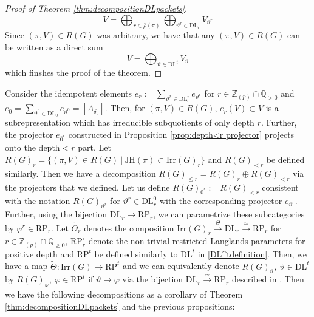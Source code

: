 \documentclass[11 pt]{article}
\numberwithin{equation}{subsection}
\theoremstyle{definition}
\theoremstyle{remark}
\theoremstyle{conjecture}
\newcommand{\Irr}{\mathrm{Irr}}
\newcommand{\DL}{\mathrm{DL}}
\newcommand{\RP}{\mathrm{RP}}
\newcommand{\JH}{\mathrm{JH}}
\newcommand{\Z}{\mathbb Z}
\newcommand{\Q}{\mathbb Q}
\begin{document}
\begin{proof}[Proof of Theorem \ref{thm:decompositionDLpackets}]
    \begin{equation*}
        V = \bigoplus_{r \in \bar\rho(\pi)}\bigoplus_{\vartheta^r \in \DL_r} V_{\vartheta^r}
    \end{equation*}
    Since $(\pi, V)\in R(G)$ was arbitrary, we have that any $(\pi, V)\in R(G)$ can be written as a direct sum 
    \begin{equation*}
        V= \bigoplus_{\vartheta\in \DL^t}V_{\vartheta}
    \end{equation*}
    which finshes the proof of the theorem. 
    \end{proof}


Consider the idempotent elements $e_r :=\sum_{\vartheta^r \in \DL_r^\circ}e_{\vartheta^r}$ for $r\in \Z_{(p)}\cap \Q_{>0}$ and $e_0=\sum_{\vartheta^0 \in \DL_0}e_{\vartheta^0}=[A_{\delta_0}]$. Then, for $(\pi,V)\in R(G)$, $e_r(V)\subset V$ is a subrepresentation which has irreducible subquotients of only depth $r$. Further, the projector $e_{\bar0^r} $ constructed in Proposition \ref{prop:depth<r projector} projects onto the depth$<r$ part. Let $R(G)_r=\{(\pi,V)\in R(G)\:|\: \JH(\pi)\subset \Irr(G)_r\}$ and $R(G)_{<r}$ be defined similarly.  Then we have a decomposition $R(G)_{\leq r}=R(G)_r\oplus R(G)_{<r}$ via the projectors that we defined. Let us define $R(G)_{\bar 0^r}:=R(G)_{<r}$ consistent with the notation $R(G)_{\vartheta^r}$ for $\vartheta^r\in \DL_r^0$ with the corresponding projector $e_{\vartheta^r}$. Further, using the bijection $\DL_r \rightarrow \RP_r$, we can parametrize these subcategories by $\varphi^r \in \RP_r$. Let $\tilde\Theta_r$ denotes the composition $\Irr(G)_r\xrightarrow{\Theta}\DL_r\xrightarrow{\simeq}\RP_r$ for $r \in \Z_{(p)}\cap\Q_{\geq 0}$, $\RP_r^\circ$ denote the non-trivial restricted Langlands parameters for positive depth and $\RP^t$ be defined similarly to $\DL^t$ in \eqref{DL^tdefinition}. Then, we have a map $\tilde \Theta:\Irr(G) \rightarrow \RP^t$ and we can equivalently denote $R(G)_{\vartheta},\: \vartheta \in \DL^t$ by $R(G)_{\varphi},\:\varphi\in \RP^t$ if $\vartheta \mapsto \varphi$ via the bijection $\DL_r \xrightarrow{\simeq}\RP_r$ described in \cite{chendebackertsai}. Then we have the following decompositions as a corollary of Theorem \ref{thm:decompositionDLpackets} and the previous propositions:
\end{document}
